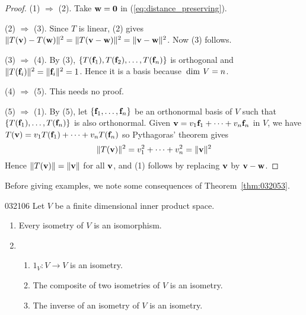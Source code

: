 \begin{proof}
(1) $\Rightarrow$ (2). Take $\textbf{w} = \textbf{0}$ in (\ref{eq:distance_preserving}).

(2) $\Rightarrow$ (3). Since $T$ is linear, (2) gives $\|
T(\textbf{v}) - T(\textbf{w})\|^{2} = \| T(\textbf{v} - \textbf{w})\|^{2} = \|\textbf{v} - \textbf{w}\|^{2}$. Now (3) follows.

(3) $\Rightarrow$ (4). By (3), $\{T(\textbf{f}_{1}), T(\textbf{f}_{2}), \dots, T(\textbf{f}_{n})\}$ is orthogonal and $\| T(\textbf{f}_{i})\|^{2} = \|\textbf{f}_{i}\|^{2} = 1$. Hence it is a basis because $\thinspace\operatorname{dim\medspace} V = n$.

(4) $\Rightarrow$ (5). This needs no proof.

(5) $\Rightarrow$ (1). By (5), let $\{\textbf{f}_{1}, \dots, \textbf{f}_{n}\}$ be an orthonormal basis of $V$ such that$\{T(\textbf{f}_{1}), \dots, T(\textbf{f}_{n})\}$ is also orthonormal. Given $\textbf{v} = v_{1}\textbf{f}_{1} + \dots + v_{n}\textbf{f}_{n}$ in $V$, we have $T(\textbf{v}) = v_{1}T(\textbf{f}_{1}) + \dots + v_{n}T(\textbf{f}_{n})$ so Pythagoras' theorem gives
\begin{equation*}
\| T(\textbf{v}) \| ^2 = v_1^2 + \dots + v_n^2 = \| \textbf{v} \| ^2
\end{equation*}
Hence $\| T(\textbf{v})\| = \|\textbf{v}\|$ for all $\textbf{v}$, and (1) follows by replacing $\textbf{v}$ by $\textbf{v} - \textbf{w}$.
\end{proof}

Before giving examples, we note some consequences of Theorem~\ref{thm:032053}.

\begin{corollary}{}{032106}
Let $V$ be a finite dimensional inner product space.

\begin{enumerate}
\item Every isometry of $V$ is an isomorphism.\footnotemark

\item 
\begin{enumerate}[label={\alph*.}]
\item $1_{V} : V \to V$ is an isometry.

\item The composite of two isometries of $V$ is an isometry.

\item The inverse of an isometry of $V$ is an isometry.

\end{enumerate}
\end{enumerate}
\end{corollary}

